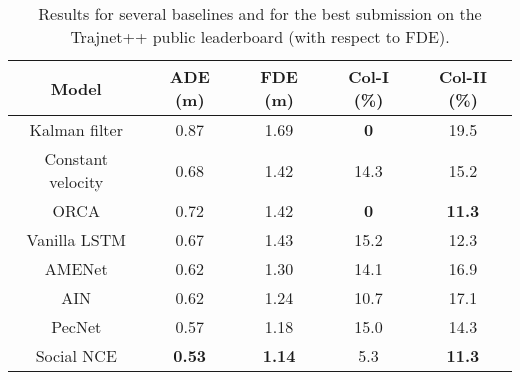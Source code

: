 \documentclass[conference]{IEEEtran}
\begin{document}
\setlength\tabcolsep{4pt}
\begin{table}[ht]
\caption{Results for several baselines and for the best submission on the Trajnet++ public leaderboard (with respect to FDE).}
\begin{tabular}{c|c|c|c|c}
\toprule
\multicolumn{1}{c}{\textbf{Model}}    & \multicolumn{1}{c}{\textbf{ADE (m)}} & \multicolumn{1}{c}{\textbf{FDE (m)}} & \multicolumn{1}{c}{\textbf{Col-I (\%)}} & \textbf{Col-II (\%)}  \\ \hline
Kalman filter                & 0.87          & 1.69            & \textbf{0 }                  & 19.5       \\ \hdashline
Constant velocity  \cite{scholler_what_2020}         & 0.68          & 1.42            & 14.3               & 15.2       \\ \hdashline
ORCA \cite{orca}                         & 0.72          & 1.42            & \textbf{0}                   & \textbf{11.3}       \\ \hdashline
Vanilla LSTM                 & 0.67          & 1.43            & 15.2               & 12.3       \\ \hdashline
AMENet \cite{cheng2021amenet}    & 0.62         & 1.30            & 14.1                &  16.9       \\
\hdashline
AIN \cite{zhu2020robust}     & 0.62         & 1.24            & 10.7                &  17.1       \\
\hdashline
PecNet \cite{mangalam2020not}     & 0.57          & 1.18            & 15.0                &  14.3       \\
\hdashline
Social NCE \cite{liu_social_2020} & \textbf{0.53}          & \textbf{1.14}            & 5.3                & \textbf{11.3 }      \\
\bottomrule
\end{tabular}
\label{tab1}
\end{table}
\end{document}
